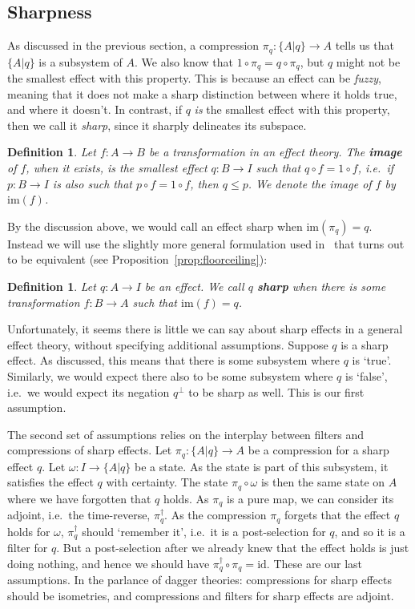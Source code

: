 \documentclass[a4paper,onecolumn,10pt,accepted=2019-05-03, issue=1, volume=1, shorttitle=papers/compositionality-1-1]{compositionalityarticle}
\newcounter{counter}
\numberwithin{counter}{section}
\newtheorem{definition}[counter]{Definition}
\newcommand{\id}{\text{id}}
\newcommand{\im}[1]{\text{im}(#1)}
\begin{document}
\subsection{Sharpness}

As discussed in the previous section, a compression ${\pi_q: \{A\lvert q\}\rightarrow A}$ tells us that $\{A\lvert q\}$ is a subsystem of $A$. We also know that $1\circ\pi_q = q\circ\pi_q$, but $q$ might not be the smallest effect with this property. This is because an effect can be \emph{fuzzy}, meaning that it does not make a sharp distinction between where it holds true, and where it doesn't. In contrast, if $q$ \emph{is} the smallest effect with this property, then we call it \emph{sharp}, since it sharply delineates its subspace.

\begin{definition}
    Let $f:A\rightarrow B$ be a transformation in an effect theory. The \textbf{image} of $f$, when it exists, is the smallest effect $q:B\rightarrow I$ such that $q\circ f = 1\circ f$, i.e.\ if $p:B\rightarrow I$ is also such that $p\circ f = 1\circ f$, then $q\leq p$. We denote the image of $f$ by $\im{f}$.
\end{definition}

By the discussion above, we would call an effect sharp when $\im{\pi_q}=q$. Instead we will use the slightly more general formulation used in~\cite{basthesis} that turns out to be equivalent (see Proposition~\ref{prop:floorceiling}):

\begin{definition}
    Let $q:A\rightarrow I$ be an effect. We call $q$ \textbf{sharp} when there is some transformation $f:B\rightarrow A$ such that $\im{f} = q$.
\end{definition}

Unfortunately, it seems there is little we can say about sharp effects in a general effect theory, without specifying additional assumptions. Suppose $q$ is a sharp effect. As discussed, this means that there is some subsystem where $q$ is `true'. Similarly, we would expect there also to be some subsystem where $q$ is `false', i.e.\ we would expect its negation $q^\perp$ to be sharp as well. This is our first assumption.

The second set of assumptions relies on the interplay between filters and compressions of sharp effects. Let $\pi_q:\{A\lvert q\}\rightarrow A$ be a compression for a sharp effect $q$. Let $\omega:I\rightarrow \{A\lvert q\}$ be a state. 
As the state is part of this subsystem, it satisfies the effect $q$ with certainty. 
The state $\pi_q\circ\omega$ is then the same state on $A$ where we have forgotten that $q$ holds. As $\pi_q$ is a pure map, we can consider its adjoint, i.e.\ the time-reverse, $\pi_q^\dagger$. As the compression $\pi_q$ forgets that the effect $q$ holds for $\omega$, $\pi_q^\dagger$ should `remember it', i.e.\ it is a post-selection for $q$, and so it is a filter for $q$. But a post-selection after we already knew that the effect holds is just doing nothing, and hence we should have $\pi_q^\dagger \circ \pi_q = \id$. These are our last assumptions. In the parlance of dagger theories: compressions for sharp effects should be isometries, and compressions and filters for sharp effects are adjoint.
\end{document}
